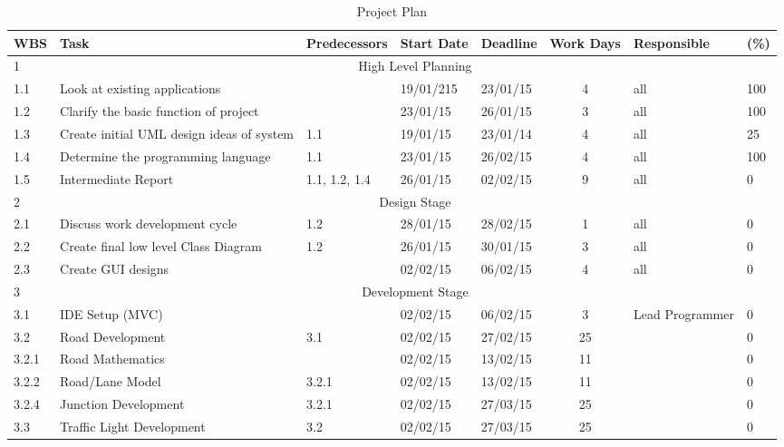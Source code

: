 \documentclass[a4paper,11pt]{article}
\begin{document}
\begin{table}[ht]
	\caption{Project Plan}
	\begin{adjustwidth}{-2cm}{}
	 \footnotesize
		
		\begin{tabular}{|m{0.8cm}|m{6cm}|m{2.3cm}|m{1.3cm}|m{1.3cm}|c|m{2.6cm}|m{0.5cm}|}\hline
			
			
			\bf{WBS} & \bf{Task} & \bf{Predecessors} & \bf{Start Date} & \bf{Deadline} & \bf{Work Days} & \bf{Responsible} & \bf{(\%)} \\ \hline 
			1 & \multicolumn{7}{c|}{High Level Planning}  \\\hline 
			1.1 & Look at existing applications &  & 19/01/215 & 23/01/15 & 4 & all & 100 \\ \hline 
			1.2 & Clarify the basic function of project &  & 23/01/15 & 26/01/15 & 3 & all & 100 \\ \hline 
			1.3 & Create initial UML design ideas of system & 1.1 & 19/01/15 & 23/01/14 & 4 & all & 25 \\ \hline 
			1.4 & Determine the programming language & 1.1 & 23/01/15 & 26/02/15 & 4 & all & 100 \\\hline 
			1.5 & Intermediate Report & 1.1, 1.2, 1.4 & 26/01/15 & 02/02/15 & 9 & all & 0 \\\hline 
			2 & \multicolumn{7}{c|}{Design Stage}  \\\hline 
			2.1 & Discuss work development cycle  & 1.2 & 28/01/15 & 28/02/15 & 1 & all & 0 \\\hline 
			2.2 & Create final low level Class Diagram  & 1.2 & 26/01/15 & 30/01/15 & 3 & all & 0 \\\hline 
			2.3 & Create GUI designs  &  & 02/02/15 & 06/02/15 & 4 & all & 0 \\\hline 
			3 & \multicolumn{7}{c|}{Development Stage}  \\\hline 
			3.1 & IDE Setup (MVC) &  & 02/02/15 & 06/02/15 & 3 & Lead Programmer & 0 \\\hline 
			3.2 & Road Development  & 3.1 & 02/02/15 & 27/02/15 & 25 &  & 0 \\\hline 
			3.2.1 & Road Mathematics  &  & 02/02/15 & 13/02/15 & 11 &  & 0 \\\hline 
			3.2.2 & Road/Lane Model & 3.2.1 & 02/02/15 & 13/02/15 & 11 &  & 0 \\\hline 
			3.2.4 & Junction Development  & 3.2.1 & 02/02/15 & 27/03/15 & 25 &  & 0 \\\hline 
			3.3 & Traffic Light Development & 3.2 & 02/02/15 & 27/03/15 & 25 &  & 0 \\\hline 

\end{tabular}
\end{adjustwidth}
\end{table}
\end{document}
